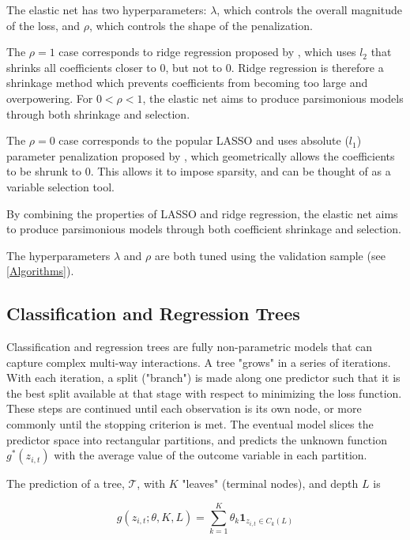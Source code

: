\documentclass[a4paper, table]{article}
\begin{document}
The elastic net has two hyperparameters: $\lambda$, which controls the overall magnitude of the loss, and $\rho$, which controls the shape of the penalization. 

The $\rho = 1$ case corresponds to ridge regression proposed by \cite{hoerl_ridge_1970}, which uses $l_2$ that shrinks all coefficients closer to 0, but not to 0. Ridge regression is therefore a shrinkage method which prevents coefficients from becoming too large and overpowering. For \(0 < \rho < 1\), the elastic net aims to produce parsimonious models through both shrinkage and selection.

The $\rho = 0$ case corresponds to the popular LASSO and uses absolute ($l_1$) parameter penalization proposed by \cite{tibshirani_regression_1996}, which geometrically allows the coefficients to be shrunk to 0. This allows it to impose sparsity, and can be thought of as a variable selection tool.

By combining the properties of LASSO and ridge regression, the elastic net aims to produce parsimonious models through both coefficient shrinkage and selection.

The hyperparameters $\lambda$ and $\rho$ are both tuned using the validation sample (see \ref{Algorithms}). 

\pagebreak

\subsection{Classification and Regression Trees}

Classification and regression trees are fully non-parametric models that can capture complex multi-way interactions. A tree "grows" in a series of iterations. With each iteration, a split ("branch") is made along one predictor such that it is the best split available at that stage with respect to minimizing the loss function. These steps are continued until each observation is its own node, or more commonly until the stopping criterion is met. The eventual model slices the predictor space into rectangular partitions, and predicts the unknown function $g^*(z_{i,t})$ with the average value of the outcome variable in each partition.

The prediction of a tree, $\mathcal{T}$, with \(K\) "leaves" (terminal nodes), and depth $L$ is

\begin{equation}
	g(z_{i,t};\theta,K,L) = \sum_{k=1}^{K}\theta_k\textbf{1}_{z_{i,t}\in C_k(L)}
\end{equation}
\end{document}
